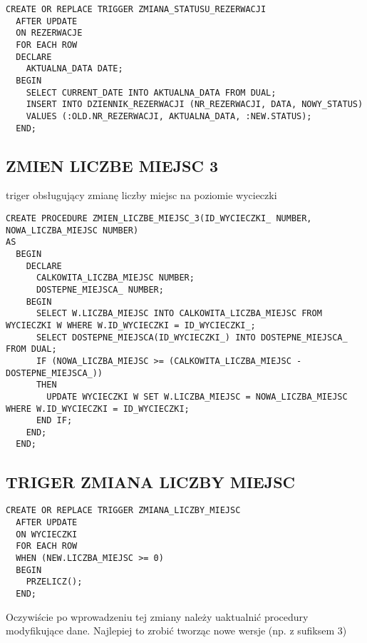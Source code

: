 \begin{verbatim}
CREATE OR REPLACE TRIGGER ZMIANA_STATUSU_REZERWACJI
  AFTER UPDATE
  ON REZERWACJE
  FOR EACH ROW
  DECLARE
    AKTUALNA_DATA DATE;
  BEGIN
    SELECT CURRENT_DATE INTO AKTUALNA_DATA FROM DUAL;
    INSERT INTO DZIENNIK_REZERWACJI (NR_REZERWACJI, DATA, NOWY_STATUS)
    VALUES (:OLD.NR_REZERWACJI, AKTUALNA_DATA, :NEW.STATUS);
  END;
\end{verbatim}

\subsection{ZMIEN LICZBE MIEJSC 3}
triger obsługujący zmianę liczby miejsc na poziomie wycieczki
\begin{verbatim}
CREATE PROCEDURE ZMIEN_LICZBE_MIEJSC_3(ID_WYCIECZKI_ NUMBER, NOWA_LICZBA_MIEJSC NUMBER)
AS
  BEGIN
    DECLARE
      CALKOWITA_LICZBA_MIEJSC NUMBER;
      DOSTEPNE_MIEJSCA_ NUMBER;
    BEGIN
      SELECT W.LICZBA_MIEJSC INTO CALKOWITA_LICZBA_MIEJSC FROM WYCIECZKI W WHERE W.ID_WYCIECZKI = ID_WYCIECZKI_;
      SELECT DOSTEPNE_MIEJSCA(ID_WYCIECZKI_) INTO DOSTEPNE_MIEJSCA_ FROM DUAL;
      IF (NOWA_LICZBA_MIEJSC >= (CALKOWITA_LICZBA_MIEJSC - DOSTEPNE_MIEJSCA_))
      THEN
        UPDATE WYCIECZKI W SET W.LICZBA_MIEJSC = NOWA_LICZBA_MIEJSC WHERE W.ID_WYCIECZKI = ID_WYCIECZKI;
      END IF;
    END;
  END;
\end{verbatim}

\subsection{TRIGER ZMIANA LICZBY MIEJSC}
\begin{verbatim}
CREATE OR REPLACE TRIGGER ZMIANA_LICZBY_MIEJSC
  AFTER UPDATE
  ON WYCIECZKI
  FOR EACH ROW
  WHEN (NEW.LICZBA_MIEJSC >= 0)
  BEGIN
    PRZELICZ();
  END;
\end{verbatim}



Oczywiście po wprowadzeniu tej zmiany należy uaktualnić procedury modyfikujące dane.
Najlepiej to zrobić tworząc nowe wersje (np. z sufiksem 3)